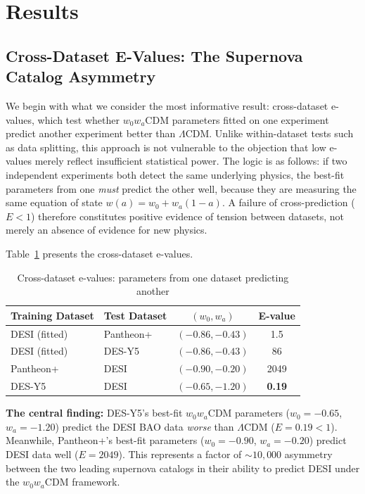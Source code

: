 \documentclass[11pt,a4paper]{article}
\newcommand{\LCDM}{$\Lambda$CDM}
\begin{document}
\section{Results}
\label{sec:results}

\subsection{Cross-Dataset E-Values: The Supernova Catalog Asymmetry}
\label{sec:cross}

We begin with what we consider the most informative result: cross-dataset e-values, which test whether $w_0w_a$CDM parameters fitted on one experiment predict another experiment better than \LCDM. Unlike within-dataset tests such as data splitting, this approach is not vulnerable to the objection that low e-values merely reflect insufficient statistical power. The logic is as follows: if two independent experiments both detect the same underlying physics, the best-fit parameters from one \textit{must} predict the other well, because they are measuring the same equation of state $w(a) = w_0 + w_a(1-a)$. A failure of cross-prediction ($E < 1$) therefore constitutes positive evidence of tension between datasets, not merely an absence of evidence for new physics.

Table~\ref{tab:cross} presents the cross-dataset e-values.

\begin{table}[H]
\centering
\caption{Cross-dataset e-values: parameters from one dataset predicting another}
\label{tab:cross}
\begin{tabular}{@{}llcc@{}}
\toprule
Training Dataset & Test Dataset & $(w_0, w_a)$ & E-value \\
\midrule
DESI (fitted) & Pantheon+ & $(-0.86, -0.43)$ & 1.5 \\
DESI (fitted) & DES-Y5 & $(-0.86, -0.43)$ & 86 \\
Pantheon+ & DESI & $(-0.90, -0.20)$ & 2049 \\
DES-Y5 & DESI & $(-0.65, -1.20)$ & \textbf{0.19} \\
\bottomrule
\end{tabular}
\end{table}

\textbf{The central finding:} DES-Y5's best-fit $w_0w_a$CDM parameters ($w_0 = -0.65$, $w_a = -1.20$) predict the DESI BAO data \textit{worse} than \LCDM{} ($E = 0.19 < 1$). Meanwhile, Pantheon+'s best-fit parameters ($w_0 = -0.90$, $w_a = -0.20$) predict DESI data well ($E = 2049$). This represents a factor of ${\sim}10{,}000$ asymmetry between the two leading supernova catalogs in their ability to predict DESI under the $w_0w_a$CDM framework.
\end{document}

